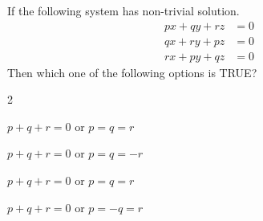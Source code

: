 				\item If the following system has non-trivial solution.
				\begin{align*}
					px + qy + rz &= 0\\
					qx + ry + pz &= 0\\
					rx + py + qz &= 0
				\end{align*}
				Then which one of the following options is TRUE?
				\hfill{}
				\begin{enumerate}
				\end{enumerate}
				
